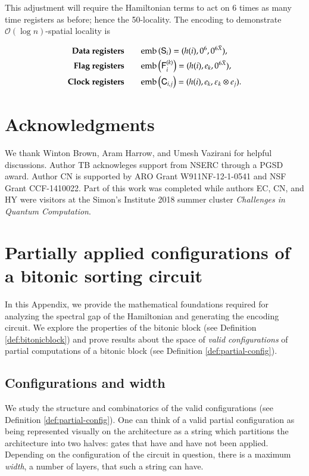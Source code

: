 \documentclass[11pt,letterpaper]{article}
\theoremstyle{definition}
\theoremstyle{remark}
\let\epsilon=\varepsilon
\numberwithin{equation}{section}
\newcommand{\e}{\epsilon}
\theoremstyle{definition}
\newcommand{\sC}{{\mathsf{C}}}
\newcommand{\sF}{{\mathsf{F}}}
\newcommand{\sS}{{\mathsf{S}}}
\begin{document}
This adjustment will require the Hamiltonian terms to act on 6 times as many time registers as before; hence the 50-locality. The encoding to demonstrate $\mathcal{O}(\log n)$-spatial locality is

\begin{align}
\textbf{Data registers}  &\qquad \emb \left(\sS_i \right) = (h(i), 0^6, 0^{6\bar{X}}), \\
\textbf{Flag registers}  &\qquad \emb\left(\sF_i^{(k)}\right) = (h(i), e_k, 0^{6\bar{X}}), \\
\textbf{Clock registers} &\qquad \emb\left(\sC_{i,j}\right) = (h(i), e_k, \e_k \otimes e_j).
\end{align}

\section*{Acknowledgments}
We thank Winton Brown, Aram Harrow, and Umesh Vazirani for helpful discussions.
Author TB acknowleges support from NSERC through a PGSD award.
Author CN is supported by ARO Grant W911NF-12-1-0541 and NSF Grant CCF-1410022.
Part of this work was completed while authors EC, CN, and HY were visitors at the Simon's Institute 2018 summer cluster \emph{Challenges in Quantum Computation}.




\appendix

%

\section{Partially applied configurations of a bitonic sorting circuit}
\label{appendix:bitonic}

In this Appendix, we provide the mathematical foundations required for analyzing the spectral gap of the Hamiltonian and generating the encoding circuit. We explore the properties of the bitonic block \cite{Batcher:1968:SNA:1468075.1468121} (see Definition \ref{def:bitonicblock}) and prove results about the space of \emph{valid configurations} of partial computations of a bitonic block (see Definition \ref{def:partial-config}).


\subsection{Configurations and width}

We study the structure and combinatorics of the valid configurations (see Definition \ref{def:partial-config}).
One can think of a valid partial configuration as being represented visually on the architecture as a string which partitions the architecture into two halves: gates that have and have not been applied. Depending on the configuration of the circuit in question, there is a maximum \emph{width}, a number of layers, that such a string can have.
\end{document}
